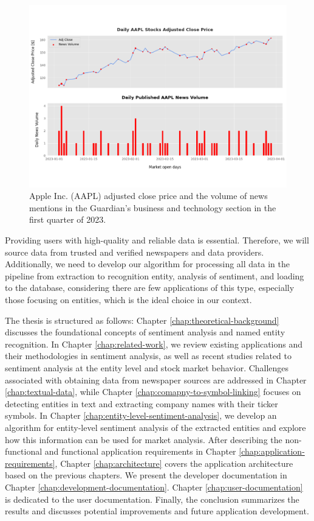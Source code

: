 \begin{figure}[htbp]
    \centering
    \includegraphics[width=\textwidth]{img/intro/apple-intro-a.pdf}
    \caption{Apple Inc. (AAPL) adjusted close price and the volume of news mentions in the Guardian's business and technology section in the first quarter of 2023.}
    \label{fig:apple-intro}
\end{figure}

Providing users with high-quality and reliable data is essential. Therefore, we will source data from trusted and verified newspapers and data providers. Additionally, we need to develop our algorithm for processing all data in the pipeline from extraction to recognition entity, analysis of sentiment, and loading to the database, considering there are few applications of this type, especially those focusing on entities, which is the ideal choice in our context.

The thesis is structured as follows: Chapter \ref{chap:theoretical-background} discusses the foundational concepts of sentiment analysis and named entity recognition. In Chapter \ref{chap:related-work}, we review existing applications and their methodologies in sentiment analysis, as well as recent studies related to sentiment analysis at the entity level and stock market behavior. Challenges associated with obtaining data from newspaper sources are addressed in Chapter \ref{chap:textual-data}, while Chapter \ref{chap:comapny-to-symbol-linking} focuses on detecting entities in text and extracting company names with their ticker symbols. In Chapter \ref{chap:entity-level-sentiment-analysis}, we develop an algorithm for entity-level sentiment analysis of the extracted entities and explore how this information can be used for market analysis. After describing the non-functional and functional application requirements in Chapter \ref{chap:application-requirements}, Chapter \ref{chap:architecture} covers the application architecture based on the previous chapters. We present the developer documentation in Chapter \ref{chap:development-documentation}. Chapter \ref{chap:user-documentation} is dedicated to the user documentation. Finally, the conclusion summarizes the results and discusses potential improvements and future application development.